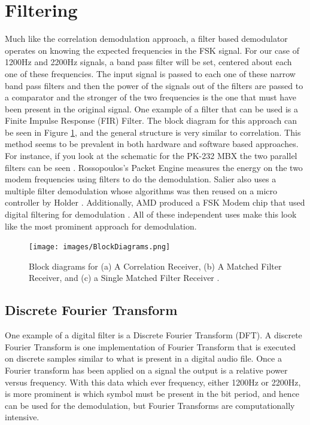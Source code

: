\section{Filtering}
Much like the correlation demodulation approach, a filter based demodulator operates on knowing the expected frequencies in the FSK signal. For our case of 1200Hz and 2200Hz signals, a band pass filter will be set, centered about each one of these frequencies. The input signal is passed to each one of these narrow band pass filters and then the power of the signals out of the filters are passed to a comparator and the stronger of the two frequencies is the one that must have been present in the original signal. One example of a filter that can be used is a Finite Impulse Response (FIR) Filter. The block diagram for this approach can be seen in Figure \ref{BlockDiagrams}, and the general structure is very similar to correlation. This method seems to be prevalent in both hardware and software based approaches. For instance, if you look at the schematic for the PK-232 MBX the two parallel filters can be seen \cite{Inc.2001}. Rossopoulos's Packet Engine measures the energy on the two modem frequencies using filters to do the demodulation. Salier also uses a multiple filter demodulation \cite{Salier1995} whose algorithms was then reused on a micro controller by Holder \cite{Holder2012}. Additionally, AMD produced a FSK Modem chip that used digital filtering for demodulation \cite{Devices1989}. All of these independent uses make this look like the most prominent approach for demodulation. 

\begin{figure}
  \centering
	\texttt{[image: images/BlockDiagrams.png]} 
	\caption{Block diagrams for (a) A Correlation Receiver, (b) A Matched Filter Receiver, and (c) a Single Matched Filter Receiver \cite{J.Das1986}.}
   \label{BlockDiagrams}
\end{figure}

\subsection{Discrete Fourier Transform}
One example of a digital filter is a Discrete Fourier Transform (DFT). A discrete Fourier Transform is one implementation of Fourier Transform that is executed on discrete samples similar to what is present in a digital audio file. Once a Fourier transform has been applied on a signal the output is a relative power versus frequency. With this data which ever frequency, either 1200Hz or 2200Hz, is more prominent is which symbol must be present in the bit period, and hence can be used for the demodulation, but Fourier Transforms are computationally intensive.

